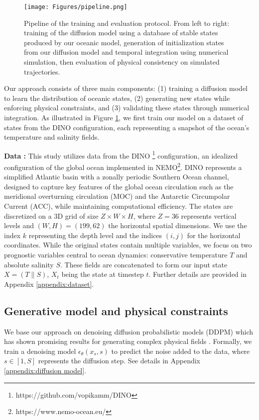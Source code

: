 \documentclass{article}
\begin{document}
\begin{figure}[h]
    \texttt{[image: Figures/pipeline.png]}
    \caption{Pipeline of the training and evaluation protocol. From left to right: training of the diffusion model using a database of stable states produced by our oceanic model, generation of initialization states from our diffusion model and temporal integration using numerical simulation, then evaluation of physical consistency on simulated trajectories.}
    \label{fig:pipeline}
\end{figure}

Our approach consists of three main components: (1) training a diffusion model to learn the distribution of oceanic states, (2) generating new states while enforcing physical constraints, and (3) validating these states through numerical integration. As illustrated in Figure \ref{fig:pipeline}, we first train our model on a dataset of states from the DINO configuration, each representing a snapshot of the ocean's temperature and salinity fields.

\textbf{Data :} This study utilizes data from the DINO \footnote{https://github.com/vopikamm/DINO} configuration,
an idealized configuration of the global ocean implemented in NEMO\footnote{https://www.nemo-ocean.eu/}.
DINO represents a simplified Atlantic basin with a zonally periodic Southern Ocean channel,
designed to capture key features of the global ocean circulation
such as the meridional overturning circulation (MOC) and the Antarctic Circumpolar Current (ACC), while maintaining computational efficiency.
The states are discretized on a 3D grid of size $Z \times W \times H$, where $Z=36$ represents vertical levels and $(W,H)=(199,62)$ the horizontal spatial dimensions. We use the index $k$ representing the depth level and the indices $(i,j)$ for the horizontal coordinates. While the original states contain multiple variables, we focus on two prognostic variables central to ocean dynamics: conservative temperature $T$ and absolute salinity $S$. These fields are concatenated to form our input state $X = (T \| S)$, $X_t$ being the state at timestep $t$.  Further details are provided in Appendix \ref{appendix:dataset}. %


\subsection{Generative model and physical constraints}

We base our approach on denoising diffusion probabilistic models (DDPM) \citep{ho2020denoising} %
which has shown promising results for generating complex physical fields \citep{yang2023zero}. Formally, we train a denoising model $\epsilon_\theta(x_s, s)$ to predict the noise added to the data, where
$s \in [1,S]$ represents the diffusion step. See details in Appendix \ref{appendix:diffusion model}.
\end{document}
